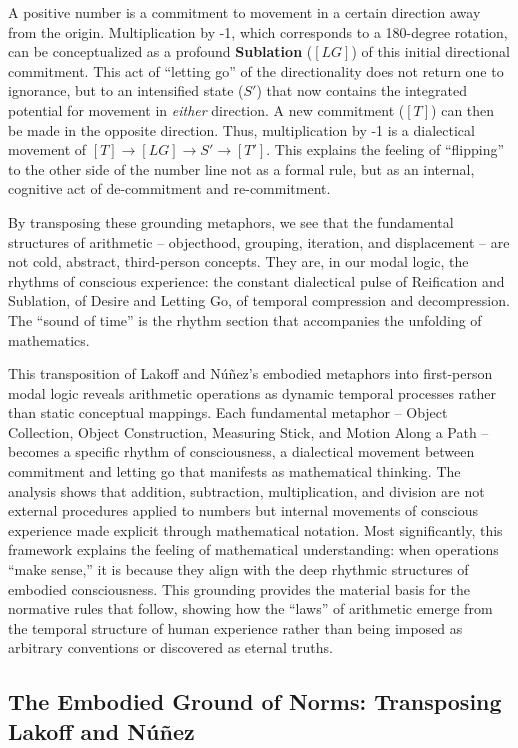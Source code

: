 \documentclass[12pt]{book}
\begin{document}
A positive number is a commitment to movement in a certain direction away from the origin. Multiplication by -1, which corresponds to a 180-degree rotation, can be conceptualized as a profound \textbf{Sublation} ($[LG]$) of this initial directional commitment. This act of ``letting go'' of the directionality does not return one to ignorance, but to an intensified state ($S'$) that now contains the integrated potential for movement in \textit{either} direction. A new commitment ($[T]$) can then be made in the opposite direction. Thus, multiplication by -1 is a dialectical movement of $[T] \rightarrow [LG] \rightarrow S' \rightarrow [T']$. This explains the feeling of ``flipping'' to the other side of the number line not as a formal rule, but as an internal, cognitive act of de-commitment and re-commitment.

By transposing these grounding metaphors, we see that the fundamental structures of arithmetic -- objecthood, grouping, iteration, and displacement -- are not cold, abstract, third-person concepts. They are, in our modal logic, the rhythms of conscious experience: the constant dialectical pulse of Reification and Sublation, of Desire and Letting Go, of temporal compression and decompression. The ``sound of time'' is the rhythm section that accompanies the unfolding of mathematics.

This transposition of Lakoff and Núñez's embodied metaphors into first-person modal logic reveals arithmetic operations as dynamic temporal processes rather than static conceptual mappings. Each fundamental metaphor -- Object Collection, Object Construction, Measuring Stick, and Motion Along a Path -- becomes a specific rhythm of consciousness, a dialectical movement between commitment and letting go that manifests as mathematical thinking. The analysis shows that addition, subtraction, multiplication, and division are not external procedures applied to numbers but internal movements of conscious experience made explicit through mathematical notation. Most significantly, this framework explains the feeling of mathematical understanding: when operations ``make sense,'' it is because they align with the deep rhythmic structures of embodied consciousness. This grounding provides the material basis for the normative rules that follow, showing how the ``laws'' of arithmetic emerge from the temporal structure of human experience rather than being imposed as arbitrary conventions or discovered as eternal truths.


\subsection{The Embodied Ground of Norms: Transposing Lakoff and Núñez}
\end{document}

